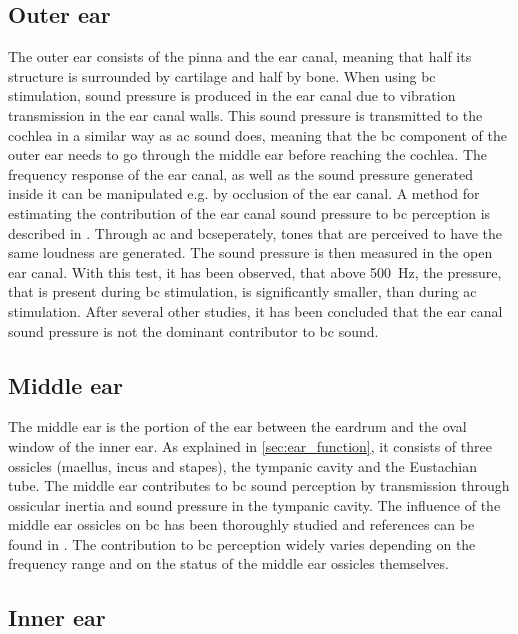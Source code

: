 \subsection*{Outer ear}

The outer ear consists of the pinna and the ear canal, meaning that half its structure is surrounded by cartilage and half by bone. When using \gls{bc} stimulation, sound pressure is produced in the ear canal due to vibration transmission in the ear canal walls. This sound pressure is transmitted to the cochlea in a similar way as \gls{ac} sound does, meaning that the \gls{bc} component of the outer ear needs to go through the middle ear before reaching the cochlea. The frequency response of the ear canal, as well as the sound pressure generated inside it can be manipulated e.g. by occlusion of the ear canal. A method for estimating the contribution of the ear canal sound pressure to \gls{bc} perception is described in \citep{puria_2013}. Through \gls{ac} and \gls{bc}seperately, tones that are perceived to have the same loudness are generated. The sound pressure is then measured in the open ear canal. With this test, it has been observed, that above \SI{500}{\hertz}, the pressure, that is present during \gls{bc} stimulation, is significantly smaller, than during \gls{ac} stimulation. After several other studies, it has been concluded that the ear canal sound pressure is not the dominant contributor to \gls{bc} sound.

\subsection*{Middle ear}

The middle ear is the portion of the ear between the eardrum and the oval window of the inner ear. As explained in \autoref{sec:ear_function}, it consists of three ossicles (maellus, incus and stapes), the tympanic cavity and the Eustachian tube. The middle ear contributes to \gls{bc} sound perception by transmission through ossicular inertia and sound pressure in the tympanic cavity. The influence of the middle ear ossicles on \gls{bc} has been thoroughly studied and references can be found in \citep[Sec. 6.5]{puria_2013}. The contribution to \gls{bc} perception widely varies depending on the frequency range and on the status of the middle ear ossicles themselves.

\subsection*{Inner ear}

